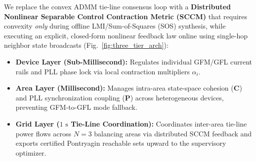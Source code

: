 \documentclass[journal]{IEEEtran}
\begin{document}
We replace the convex ADMM tie-line consensus loop with a \textbf{Distributed Nonlinear Separable Control Contraction Metric (SCCM)} \cite{shiromoto18} that requires convexity \emph{only} during offline LMI/Sum-of-Squares (SOS) synthesis, while executing an explicit, closed-form nonlinear feedback law online using single-hop neighbor state broadcasts (Fig.~\ref{fig:three_tier_arch}):
\begin{itemize}
    \item \textbf{Device Layer (Sub-Millisecond):} Regulates individual GFM/GFL current rails and PLL phase lock via local contraction multipliers $\alpha_i$.
    \item \textbf{Area Layer (Millisecond):} Manages intra-area state-space cohesion ($\mathbf{C}$) and PLL synchronization coupling ($\mathbf{P}$) across heterogeneous devices, preventing GFM-to-GFL mode fallback.
    \item \textbf{Grid Layer ($1\text{ s}$ Tie-Line Coordination):} Coordinates inter-area tie-line power flows across $N=3$ balancing areas via distributed SCCM feedback and exports certified Pontryagin reachable sets upward to the supervisory optimizer.
\end{itemize}
\end{document}
